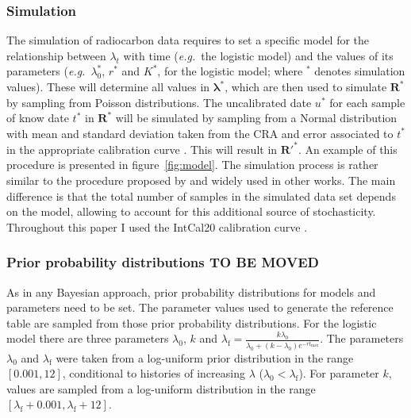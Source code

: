 \documentclass[a4paper]{article}
\begin{document}

\subsubsection*{Simulation}

The simulation of radiocarbon data requires to set a specific model for the relationship between $\lambda_t$ with time (\emph{e.g.}\ the logistic model) and the values of its parameters (\emph{e.g.}\ $\lambda_0^*$, $r^*$ and $K^*$, for the logistic model; where $^*$ denotes simulation values). These will determine all values in $\bm{\lambda}^*$, which are then used to simulate $\bm{R}^*$ by sampling from Poisson distributions. The uncalibrated date $u^*$ for each sample of know date $t^*$ in $\bm{R}^*$ will be simulated by sampling from a Normal distribution with mean and standard deviation taken from the CRA and error associated to $t^*$ in the appropriate calibration curve \parencite{Shennan2013}. This will result in $\bm{R}'^*$. An example of this procedure is presented in figure~\ref{fig:model}. The simulation process is rather similar to the procedure proposed by \textcite{Shennan2013} and widely used in other works. The main difference is that the total number of samples in the simulated data set depends on the model, allowing to account for this additional source of stochasticity. Throughout this paper I used the IntCal20 calibration curve \parencite{Reimer2020}.
\\



\subsubsection*{Prior probability distributions TO BE MOVED}

As in any Bayesian approach, prior probability distributions for models and parameters need to be set. The parameter values used to generate the reference table are sampled from those prior probability distributions. For the logistic model there are three parameters $\lambda_0$, $k$ and $\lambda_\mathrm{f}=\frac{k\lambda_0}{\lambda_0+(k-\lambda_0)e^{-rt_{\max}}}$. The parameters $\lambda_0$ and $\lambda_\mathrm{f}$ were taken from a log-uniform prior distribution in the range $\left[ 0.001,12\right]$, conditional to histories of increasing $\lambda$ ($\lambda_0 < \lambda_\mathrm{f}$). For parameter $k$, values are sampled from a log-uniform distribution in the range $\left[\lambda_\mathrm{f}+0.001,\lambda_\mathrm{f}+12\right]$.
\\
\end{document}
